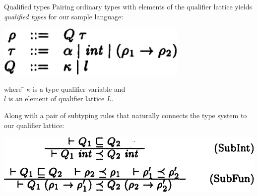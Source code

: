 \documentclass{beamer}
\begin{document}
\begin{frame}{Qualified types}
  Pairing ordinary types with elements of the qualifier lattice yields \emph{qualified types} for our sample language:
  \begin{center}\includegraphics[scale=0.38]{paper_qualifiedtypegrammar.png}\end{center}
  \begin{tabbing}
  \hspace{4em} where \= $\kappa$ is a type qualifier variable and\\
  \> $l$ is an element of qualifier lattice $L$.
  \end{tabbing}

  Along with a pair of subtyping rules that naturally connects the type system to our qualifier lattice:
  \begin{center}\includegraphics[scale=0.30]{paper_samplelang_subtypingrules.png}\end{center}
\end{frame}
\end{document}
